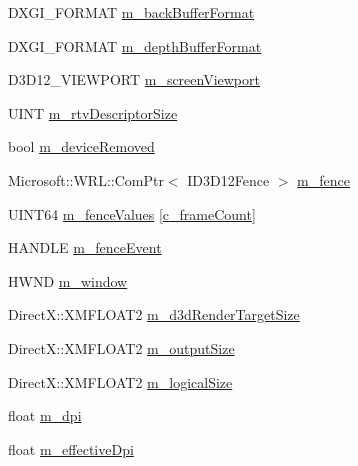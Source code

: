 \begin{DoxyCompactItemize}
\item 
D\+X\+G\+I\+\_\+\+F\+O\+R\+M\+AT \mbox{\hyperlink{class_d_x_1_1_device_resources_a9f23666e062bdebe694eb2dd7e454cba}{m\+\_\+back\+Buffer\+Format}}
\item 
D\+X\+G\+I\+\_\+\+F\+O\+R\+M\+AT \mbox{\hyperlink{class_d_x_1_1_device_resources_afb117f121edb8eb4df707d3f1b15445a}{m\+\_\+depth\+Buffer\+Format}}
\item 
D3\+D12\+\_\+\+V\+I\+E\+W\+P\+O\+RT \mbox{\hyperlink{class_d_x_1_1_device_resources_a0118fbbdb43755f01b25ed6d2e9893fc}{m\+\_\+screen\+Viewport}}
\item 
U\+I\+NT \mbox{\hyperlink{class_d_x_1_1_device_resources_adc2a1e5cbd63c54ad5a2836348a33cb8}{m\+\_\+rtv\+Descriptor\+Size}}
\item 
bool \mbox{\hyperlink{class_d_x_1_1_device_resources_af4d113c651dcae9a344094cfc02a6a09}{m\+\_\+device\+Removed}}
\item 
Microsoft\+::\+W\+R\+L\+::\+Com\+Ptr$<$ I\+D3\+D12\+Fence $>$ \mbox{\hyperlink{class_d_x_1_1_device_resources_a147e6a63f6a733dc64c766c472d29d20}{m\+\_\+fence}}
\item 
U\+I\+N\+T64 \mbox{\hyperlink{class_d_x_1_1_device_resources_a393281583e4e020d7a2d05c060c588a8}{m\+\_\+fence\+Values}} \mbox{[}\mbox{\hyperlink{namespace_d_x_a13eecb6f150dc97fc5c7c8597377d0fb}{c\+\_\+frame\+Count}}\mbox{]}
\item 
H\+A\+N\+D\+LE \mbox{\hyperlink{class_d_x_1_1_device_resources_af3ecc18e8cf542dbcbd33872605e1b62}{m\+\_\+fence\+Event}}
\item 
H\+W\+ND \mbox{\hyperlink{class_d_x_1_1_device_resources_a71c1253aac157673ae385bf9d705584c}{m\+\_\+window}}
\item 
Direct\+X\+::\+X\+M\+F\+L\+O\+A\+T2 \mbox{\hyperlink{class_d_x_1_1_device_resources_a8ee855b75ab68a9fcc5f3564403cf8f8}{m\+\_\+d3d\+Render\+Target\+Size}}
\item 
Direct\+X\+::\+X\+M\+F\+L\+O\+A\+T2 \mbox{\hyperlink{class_d_x_1_1_device_resources_aa102e231efe8bb03f3a91728f8477d08}{m\+\_\+output\+Size}}
\item 
Direct\+X\+::\+X\+M\+F\+L\+O\+A\+T2 \mbox{\hyperlink{class_d_x_1_1_device_resources_a4689509084ecb52b9edf0f6e4ed886d9}{m\+\_\+logical\+Size}}
\item 
float \mbox{\hyperlink{class_d_x_1_1_device_resources_a1d146efc89ae892dbcd78045d493ff2a}{m\+\_\+dpi}}
\item 
float \mbox{\hyperlink{class_d_x_1_1_device_resources_a0999b5522ac0a401e92b18db8f12a663}{m\+\_\+effective\+Dpi}}
\end{DoxyCompactItemize}


